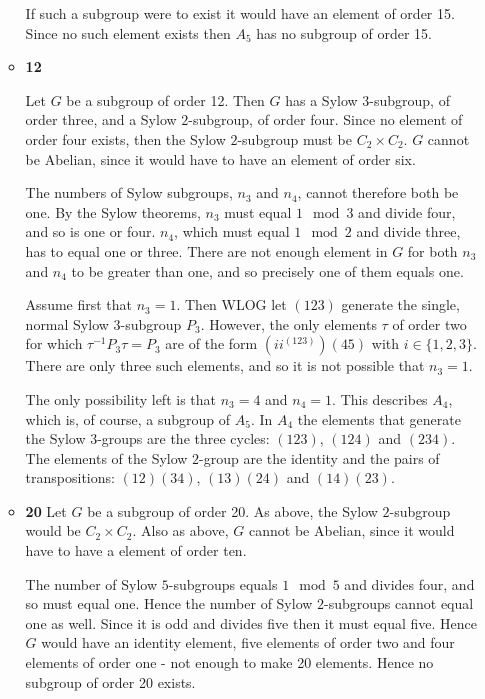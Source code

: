 \documentclass[11pt]{article} \usepackage{amssymb}
\begin{document}
\begin{enumerate}
\begin{itemize}
      If such a subgroup were to exist it would have an element of order 15. 
      Since no such element exists then $A_5$ has no subgroup of order 15.

    \item {\bf 12}
      
      Let $G$ be a subgroup of order 12. Then $G$ has a Sylow $3$-subgroup,
      of order three, and a Sylow $2$-subgroup, of order four. Since no 
      element of order four exists, then the Sylow $2$-subgroup must be 
      $C_2\times C_2$. $G$ cannot be Abelian, since it would have to have 
      an element of order six.

      The numbers of Sylow subgroups, $n_3$ and $n_4$, cannot therefore both
      be one. By the Sylow theorems, $n_3$ must equal $1\mod 3$ and divide
      four, and so is one or four. $n_4$, which must equal $1\mod 2$ and divide
      three, has to equal one or three. There are not enough element in $G$
      for both $n_3$ and $n_4$ to be greater than one, and so precisely one
      of them equals one.

      Assume first that $n_3=1$. Then WLOG let $(123)$ generate the single,
      normal Sylow $3$-subgroup $P_3$. However, the only elements $\tau$ of
      order two for which $\tau^{-1}P_3\tau=P_3$ are of the form $(ii^{(123)})(45)$ with
      $i\in\{1,2,3\}$. There are only three such elements, and so it is not
      possible that $n_3=1$.

      The only possibility left is that $n_3=4$ and $n_4=1$. This describes
      $A_4$, which is, of course, a subgroup of $A_5$. In $A_4$ the elements that
      generate the Sylow $3$-groups are the three cycles: $(123)$, $(124)$ and 
      $(234)$. The elements of the Sylow $2$-group are the identity and the 
      pairs of transpositions: $(12)(34)$, $(13)(24)$ and $(14)(23)$. 
      
    \item {\bf 20}
      Let $G$ be a subgroup of order 20.
      As above, the Sylow $2$-subgroup would
      be $C_2\times C_2$. 
      Also as above, $G$  cannot be Abelian, since it would have
      to have a element of order ten.

      The number of Sylow $5$-subgroups equals $1\mod 5$ and divides four,
      and so must equal one. Hence the number of Sylow $2$-subgroups cannot
      equal one as well. Since it is odd and divides five then it must equal
      five. Hence $G$ would have an identity element, five elements of order 
      two and four elements of order one - not enough to make 20 elements.
      Hence no subgroup of order 20 exists.


\end{itemize}
\end{enumerate}
\end{document}
